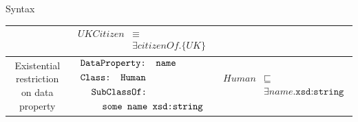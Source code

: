 \documentclass{beamer}
\newcommand\owlIndent{\hspace{4mm}}
\begin{document}
{\begin{block}{Syntax}
\begin{table}
\begin{center}
\begin{small}
\begin{tabular}{|c|c|c|}
\begin{minipage}{5cm}
						\end{minipage}	
						& 
						\begin{minipage}{4cm}
							$\begin{aligned}
								UKCitizen &\equiv\\
								 &\exists citizenOf.\{UK\}
							\end{aligned}$				
						\end{minipage}																		
						\\
						\hline	
						\begin{minipage}{1.5cm}
							Existential restriction on data property
						\end{minipage}
						& 
						\begin{minipage}{5cm}
							$\begin{aligned}
								&\texttt{DataProperty: name}\\
								&\texttt{Class: Human}\\
								&\owlIndent\texttt{SubClassOf:} \\
								&\owlIndent\owlIndent\texttt{some name xsd:string}
							\end{aligned}$
						\end{minipage}	
						& 
						\begin{minipage}{4cm}
							$\begin{aligned}
								Human &\sqsubseteq \\
								& \exists name.\texttt{xsd:string} 
							\end{aligned}$				
						\end{minipage}																		
						\\
						\hline															 				  
					\end{tabular}
				\end{small}
			\end{center}
		\end{table}
	\end{block}
}
\end{document}

